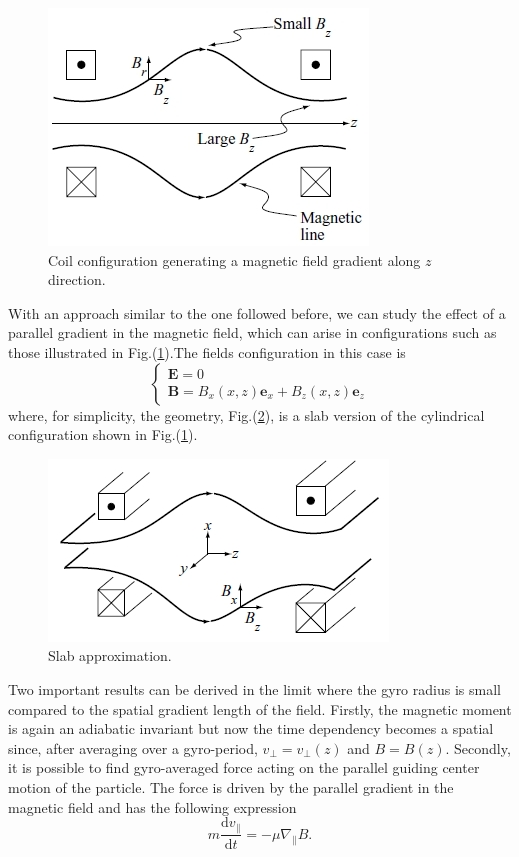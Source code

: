 \begin{figure}
\centering
\includegraphics[scale=.6]{images/B_gradient.jpg}
\caption{Coil configuration generating a magnetic field gradient along $z$ direction.}
\label{fig:B_gradient}
\end{figure}

With an approach similar to the one followed before, we can study the effect of a parallel gradient in the magnetic field, which can arise in configurations such as those illustrated in  Fig.(\ref{fig:B_gradient}).The fields configuration in this case is
\begin{equation}\label{eq:fields_mirroring}
  \begin{cases}
    \mathbf{E}=0\\
    \mathbf{B}=B_x(x,z)\mathbf{e}_x+B_z(x,z)\mathbf{e}_z
  \end{cases}
\end{equation}
where, for simplicity, the geometry, Fig.(\ref{fig:B_gradient_slab}), is a slab version of the cylindrical configuration shown in Fig.(\ref{fig:B_gradient}).

\begin{figure}
\centering
\includegraphics[scale=.6]{images/B_gradient_slab.jpg}
\caption{Slab approximation.}
\label{fig:B_gradient_slab}
\end{figure}

Two important results can be derived in the limit where the gyro radius is small compared to the spatial gradient length of the field. Firstly, the magnetic moment is again an adiabatic invariant but now the time dependency becomes a spatial since, after averaging over a gyro-period, $v_{\perp}=v_{\perp}(z)$ and $B=B(z)$. Secondly, it is possible to find gyro-averaged force acting on the parallel guiding center motion of the particle. The force is driven by the parallel gradient in the magnetic field and has the following expression
\begin{equation}
  m\frac{\mathrm{d}v_{\|}}{\mathrm{d}t}=-\mu\nabla_{\|}B.
\end{equation}

